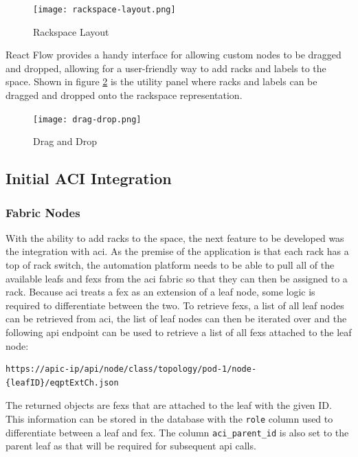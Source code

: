 \begin{figure}[H]
    \centering
    \texttt{[image: rackspace-layout.png]}
    \caption{Rackspace Layout}
    \label{fig:rackspace-layout}
\end{figure}

React Flow provides a handy interface for allowing custom nodes to be dragged and dropped, allowing for a user-friendly way to add racks and labels to the space. Shown in figure \ref{fig:drag-drop} is the utility panel where racks and labels can be dragged and dropped onto the rackspace representation.

\begin{figure}[H]
    \centering
    \texttt{[image: drag-drop.png]}
    \caption{Drag and Drop}
    \label{fig:drag-drop}
\end{figure}

\subsection{Initial ACI Integration}
\subsubsection{Fabric Nodes}
With the ability to add racks to the space, the next feature to be developed was the integration with \gls{aci}. As the premise of the application is that each rack has a top of rack switch, the automation platform needs to be able to pull all of the available leafs and \gls{fex}s from the \gls{aci} fabric so that they can then be assigned to a rack. Because \gls{aci} treats a \gls{fex} as an extension of a leaf node, some logic is required to differentiate between the two.
To retrieve \gls{fex}s, a list of all leaf nodes can be retrieved from \gls{aci}, the list of leaf nodes can then be iterated over and the following \gls{api} endpoint can be used to retrieve a list of all \gls{fex}s attached to the leaf node:
\begin{verbatim}
https://apic-ip/api/node/class/topology/pod-1/node-{leafID}/eqptExtCh.json
\end{verbatim}

The returned objects are \gls{fex}s that are attached to the leaf with the given ID. This information can be stored in the database with the \verb|role| column used to differentiate between a leaf and \gls{fex}. The column \verb|aci_parent_id| is also set to the parent leaf as that will be required for subsequent \gls{api} calls.

